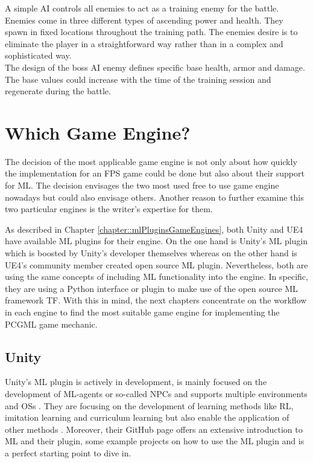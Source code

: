 \documentclass[MGS,Master,english]{twbook}%
\begin{document}
A simple AI controls all enemies to act as a training enemy for the battle. Enemies come in three different types of ascending power and health. They spawn in fixed locations throughout the training path. The enemies desire is to eliminate the player in a straightforward way rather than in a complex and sophisticated way. \\
The design of the boss AI enemy defines specific base health, armor and damage. The base values could increase with the time of the training session and regenerate during the battle.

\section{Which Game Engine?} \label{whichGameEngine}
The decision of the most applicable game engine is not only about how quickly the implementation for an FPS game could be done but also about their support for ML. The decision envisages the two most used free to use game engine nowadays but could also envisage others. Another reason to further examine this two particular engines is the writer's expertise for them.

As described in Chapter \ref{chapter::mlPluginsGameEngines}, both Unity and UE4 have available ML plugins for their engine. On the one hand is Unity's ML plugin which is boosted by Unity’s developer themselves whereas on the other hand is UE4’s community member created open source ML plugin. Nevertheless, both are using the same concepts of including ML functionality into the engine. In specific, they are using a Python interface or plugin to make use of the open source ML framework \acf{TF}. With this in mind, the next chapters concentrate on the workflow in each engine to find the most suitable game engine for implementing the PCGML game mechanic.

\subsection{Unity}
Unity's ML plugin is actively in development, is mainly focused on the development of ML-agents or so-called \ac{NPC}s and supports multiple environments and \acp{OS} \cite{unity::mlGithub}. They are focusing on the development of learning methods like RL, imitation learning and curriculum learning but also enable the application of other methods \cite{unity::mlGithub}. Moreover, their GitHub page offers an extensive introduction to ML and their plugin, some example projects on how to use the ML plugin and is a perfect starting point to dive in. 
\end{document}
